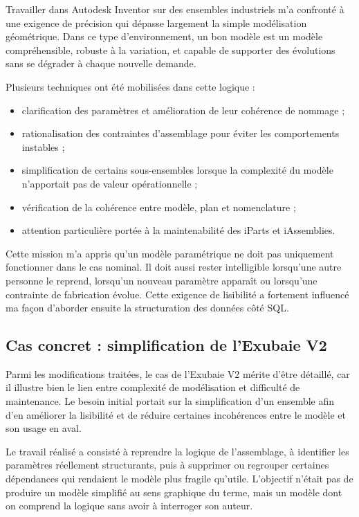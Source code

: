 Travailler dans Autodesk Inventor sur des ensembles industriels m'a confronté à une exigence de précision qui dépasse largement la simple modélisation géométrique. Dans ce type d'environnement, un bon modèle est un modèle compréhensible, robuste à la variation, et capable de supporter des évolutions sans se dégrader à chaque nouvelle demande.

Plusieurs techniques ont été mobilisées dans cette logique :

\begin{itemize}[leftmargin=1.4cm]
\item clarification des paramètres et amélioration de leur cohérence de nommage ;
\item rationalisation des contraintes d'assemblage pour éviter les comportements instables ;
\item simplification de certains sous-ensembles lorsque la complexité du modèle n'apportait pas de valeur opérationnelle ;
\item vérification de la cohérence entre modèle, plan et nomenclature ;
\item attention particulière portée à la maintenabilité des iParts et iAssemblies.
\end{itemize}

Cette mission m'a appris qu'un modèle paramétrique ne doit pas uniquement fonctionner dans le cas nominal. Il doit aussi rester intelligible lorsqu'une autre personne le reprend, lorsqu'un nouveau paramètre apparaît ou lorsqu'une contrainte de fabrication évolue. Cette exigence de lisibilité a fortement influencé ma façon d'aborder ensuite la structuration des données côté SQL.

\subsection{Cas concret : simplification de l'Exubaie V2}

Parmi les modifications traitées, le cas de l'Exubaie V2 mérite d'être détaillé, car il illustre bien le lien entre complexité de modélisation et difficulté de maintenance. Le besoin initial portait sur la simplification d'un ensemble afin d'en améliorer la lisibilité et de réduire certaines incohérences entre le modèle et son usage en aval.

Le travail réalisé a consisté à reprendre la logique de l'assemblage, à identifier les paramètres réellement structurants, puis à supprimer ou regrouper certaines dépendances qui rendaient le modèle plus fragile qu'utile. L'objectif n'était pas de produire un modèle simplifié au sens graphique du terme, mais un modèle dont on comprend la logique sans avoir à interroger son auteur.

